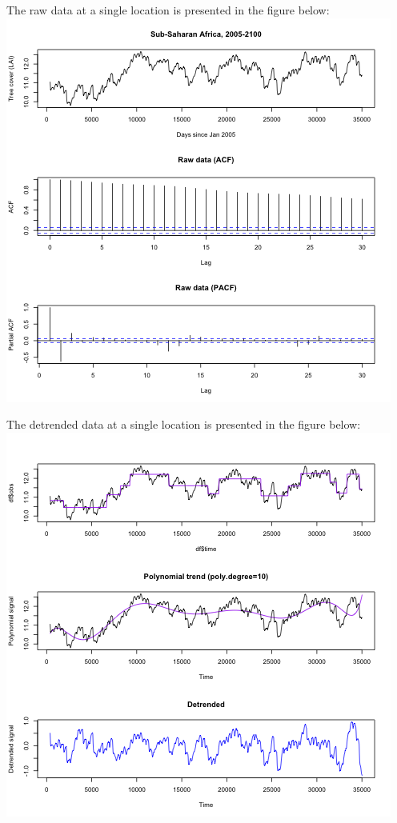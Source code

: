 \documentclass[11pt]{article}
\begin{document}
The raw data at a single location is presented in the figure below:
\includegraphics{../img/pacf_acf_raw.png}

The detrended data at a single location is presented in the figure below:
\includegraphics{../img/detrended_acf_pacf.png}
\end{document}
